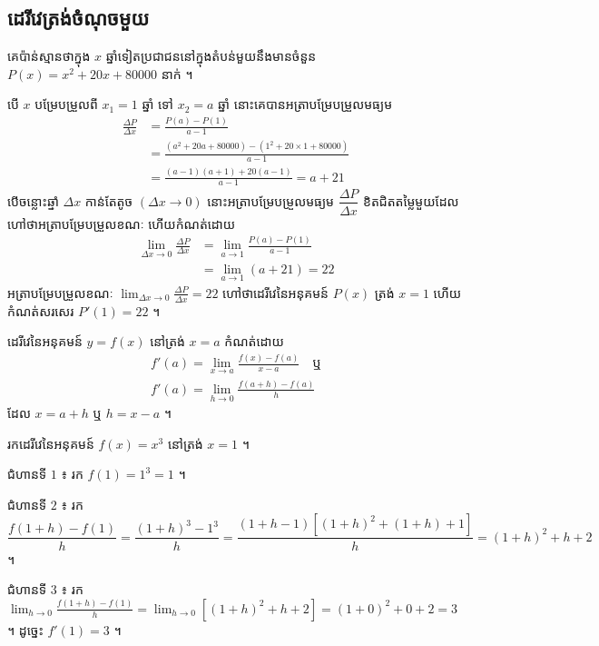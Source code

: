 \subsection{ដេរីវេត្រង់ចំណុចមួយ}

\begin{example}[ឧទាហរណ៍]
គេប៉ាន់ស្មានថាក្នុង $x$ ឆ្នាំទៀតប្រជាជននៅក្នុងតំបន់មួយនឹងមានចំនួន $P(x) = x^2 + 20x + 80000$ នាក់ ។
\end{example}
បើ $x$ បម្រែបម្រួលពី $x_1 = 1$ ឆ្នាំ ទៅ $x_2 = a$ ឆ្នាំ នោះគេបានអត្រាបម្រែបម្រួលមធ្យម
\[ \begin{aligned}
\frac{\Delta P}{\Delta x} &= \frac{P(a) - P(1)}{a - 1}\\
&= \frac{(a^2 + 20a + 80000) - (1^2 + 20\times 1 + 80000)}{a - 1}\\
&= \frac{(a - 1)(a + 1) + 20(a - 1)}{a - 1} = a + 21
\end{aligned} \]
បើចន្លោះឆ្នាំ $\Delta x$ កាន់តែតូច $(\Delta x \to 0)$ នោះអត្រាបម្រែបម្រួលមធ្យម $\dfrac{\Delta P}{\Delta x}$ ខិតជិតតម្លៃមួយដែលហៅថាអត្រាបម្រែបម្រួលខណៈ ហើយកំណត់ដោយ
\[
\begin{aligned}
\lim_{\Delta x \to 0}\frac{\Delta P}{\Delta x} &= \lim_{a \to 1}\frac{P(a) - P(1)}{a - 1}\\
&= \lim_{a \to 1}(a + 21) = 22
\end{aligned}
\]
អត្រាបម្រែបម្រួលខណៈ $\displaystyle\lim_{\Delta x \to 0}\frac{\Delta P}{\Delta x} = 22$ ហៅថាដេរីវេនៃអនុគមន៍ $P(x)$ ត្រង់ $x = 1$ ហើយកំណត់សរសេរ $P'(1) = 22$ ។

\begin{formulaBox}[ជាទូទៅ]
ដេរីវេនៃអនុគមន៍ $y = f(x)$ នៅត្រង់ $x = a$ កំណត់ដោយ
\[
\begin{gathered}
f'(a) = \lim_{x \to a}\frac{f(x) - f(a)}{x - a} \quad \text{ឬ}\\
f'(a) = \lim_{h \to 0}\frac{f(a + h) - f(a)}{h}
\end{gathered}
\]
ដែល $x = a + h$ ឬ $h = x - a$ ។
\end{formulaBox}

\begin{example}[លំហាត់គំរូ]
រកដេរីវេនៃអនុគមន៍ $f(x) = x^3$ នៅត្រង់ $x = 1$ ។
\end{example}
\ans
ជំហានទី $1$ ៖ រក $f(1) = 1^3 = 1$ ។

ជំហានទី $2$ ៖ រក $\dfrac{f(1 + h) - f(1)}{h} = \dfrac{(1 + h)^3 - 1^3}{h} = \dfrac{(1 + h - 1)[(1 + h)^2 + (1 + h) + 1]}{h} = (1 + h)^2 + h + 2$ ។

ជំហានទី $3$ ៖ រក $\displaystyle\lim_{h \to 0}\frac{f(1 + h) - f(1)}{h} = \lim_{h \to 0}[(1 + h)^2 + h + 2] = (1 + 0)^2 + 0 + 2 = 3$ ។ ដូច្នេះ $f'(1) = 3$ ។

